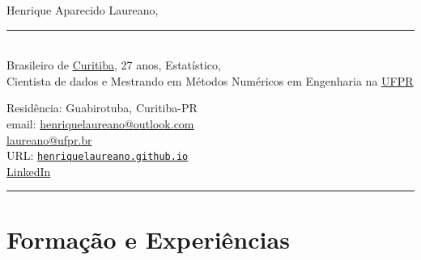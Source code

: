 \documentclass[12pt]{article}
\newcommand{\horrule}[1]{\noindent\rule{\linewidth}{#1}}
\begin{document}
\noindent
\begin{minipage}[t]{.565\textwidth}
 \raggedright
 \large Henrique Aparecido Laureano,
 \noindent\rule{.89\linewidth}{1pt}\\
 \normalsize Brasileiro de
 \href{https://goo.gl/K1Qcdv}{\color{blue}Curitiba}, 27 anos,
 Estat\'{i}stico,\\Cientista de dados e Mestrando em M\'{e}todos
 Num\'{e}ricos em Engenharia na
 \href{https://goo.gl/DtVAbi}{\color{blue}UFPR}
\end{minipage}%
\begin{minipage}[t]{.435\textwidth}
 \raggedright
 Resid\^{e}ncia: Guabirotuba, Curitiba-PR\\
 email:
 \href{mailto:henriquelaureano@outlook.com}{\color{blue}
   henriquelaureano@outlook.com}\\
 \hspace{1.2cm}
 \href{mailto:laureano@ufpr.br}{\color{blue}laureano@ufpr.br}\\
 URL:
 \href{https://henriquelaureano.github.io/}{
  \color{blue}\texttt{henriquelaureano.github.io}}\\
 \href{https://www.linkedin.com/in/henrique-laureano-025328179}{
  \color{blue}LinkedIn}
\end{minipage}

\vspace{.5cm}
\horrule{1pt}

\section*{Forma\c{c}\~{a}o e Experi\^{e}ncias}
\end{document}
